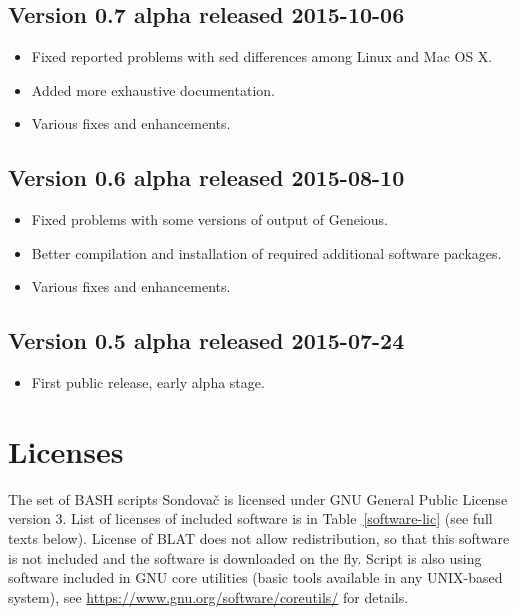 \documentclass[a4paper, 11pt, twoside]{article}
\begin{document}
\subsection{Version 0.7 alpha released 2015-10-06}

\begin{itemize}
  \item Fixed reported problems with sed differences among Linux and Mac OS X.
  \item Added more exhaustive documentation.
  \item Various fixes and enhancements.
\end{itemize}

\subsection{Version 0.6 alpha released 2015-08-10}

\begin{itemize}
  \item Fixed problems with some versions of output of Geneious.
  \item Better compilation and installation of required additional software packages.
  \item Various fixes and enhancements.
\end{itemize}

\subsection{Version 0.5 alpha released 2015-07-24}

\begin{itemize}
  \item First public release, early alpha stage.
\end{itemize}

\section{Licenses}

The set of BASH scripts Sondovač is licensed under GNU General Public License version 3. List of licenses of included software is in Table~\ref{software-lic} (see full texts below). License of BLAT does not allow redistribution, so that this software is not included and the software is downloaded on the fly. Script is also using software included in GNU core utilities (basic tools available in any UNIX-based system), see \url{https://www.gnu.org/software/coreutils/} for details.
\end{document}
